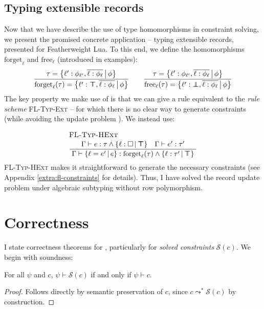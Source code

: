 \subsection{Typing extensible records}
Now that we have describe the use of type homomorphisms in constraint solving, we present the promised concrete application -- typing extensible records, presented for Featherweight Lua. To this end, we define the homomorphisms $\mathrm{forget}_\ell$ and $\mathrm{free}_\ell$ (introduced in examples):
$$ 
\dfrac
  {\tau = \flext{\ell' : \phi_{\ell'},  \overline{\ell : \phi_\ell}}{\phi}}
  {\mathrm{forget}_\ell(\tau) = \flext{\ell' : \flftop,  \overline{\ell : \phi_\ell}}{\phi}}
\qquad 
\dfrac
  {\tau = \flext{\ell' : \phi_{\ell'},  \overline{\ell : \phi_\ell}}{\phi}}
  {\mathrm{free}_\ell(\tau) = \flext{\ell' : \flfbot,  \overline{\ell : \phi_\ell}}{\phi}}
$$
The key property we make use of is that we can give a rule equivalent to the \emph{rule scheme} \textsc{FL-Typ-Ext} -- for which there is no clear way to generate constraints (while avoiding the update problem \cite{operations-on-records}). We instead use:
$$ 
\irule{FL-Typ-HExt}{\Gamma \vdash e : \tau \meet \flext{\ell : \flabsent}{\flftop} \quad \Gamma \vdash e' : \tau'}{\Gamma \vdash \flext{\ell = e'}{e} : \mathrm{forget}_\ell(\tau) \meet \flext{\ell : \tau'}{\flftop}}
$$
\textsc{FL-Typ-HExt} makes it straightforward to generate the necessary constraints (see Appendix \ref{extra:fl-constraints} for details).
Thus, I have solved the record update problem under algebraic subtyping without row polymorphism.

\section{Correctness}
\label{sec:correctness}

I state correctness theorems for \inference{}, particularly for \emph{solved constraints} $\mathcal S(c)$. We begin with soundness:
\begin{theorem}[Soundness]
    For all $\psi$ and $c$, $\psi \vdash \mathcal S(c)$ if and only if $\psi \vdash c$.
\end{theorem}
\begin{proof}
    Follows directly by semantic preservation of $c$, since $c \leadsto^* \mathcal S(c)$ by construction.
\end{proof}

